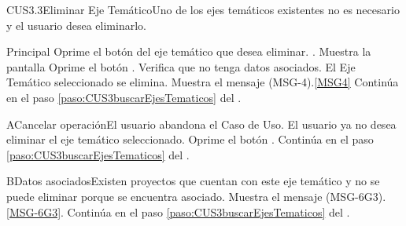 	\begin{UseCase}{CUS3.3}{Eliminar Eje Temático}{Uno de los ejes temáticos existentes no es necesario y el usuario desea eliminarlo.}
	\end{UseCase}

	\begin{UCtrayectoria}{Principal}
			\UCpaso[\UCactor] Oprime el botón  del eje temático que desea eliminar.
			.
			\UCpaso Muestra la pantalla   
			\UCpaso [\UCactor] Oprime el botón .
			\UCpaso Verifica que no tenga datos asociados.  
			\UCpaso El Eje Temático seleccionado se elimina.
			\UCpaso Muestra el mensaje (MSG-4).\ref{MSG4}
			\UCpaso Continúa en el paso \ref{paso:CUS3buscarEjesTematicos} del .
	\end{UCtrayectoria}

		\begin{UCtrayectoriaA}{A}{Cancelar operación}{El usuario abandona el Caso de Uso.}
			\UCpaso[\UCactor] El usuario ya no desea eliminar el eje temático seleccionado.
			\UCpaso[\UCactor] Oprime el botón .
			\UCpaso Continúa en el paso \ref{paso:CUS3buscarEjesTematicos} del .
		\end{UCtrayectoriaA}

		 \begin{UCtrayectoriaA}{B}{Datos asociados}{Existen proyectos que cuentan con este eje temático y no se puede eliminar porque se encuentra asociado.}
			\UCpaso Muestra el mensaje (MSG-6G3).\ref{MSG-6G3}.
			\UCpaso Continúa en el paso \ref{paso:CUS3buscarEjesTematicos} del .
		\end{UCtrayectoriaA}
